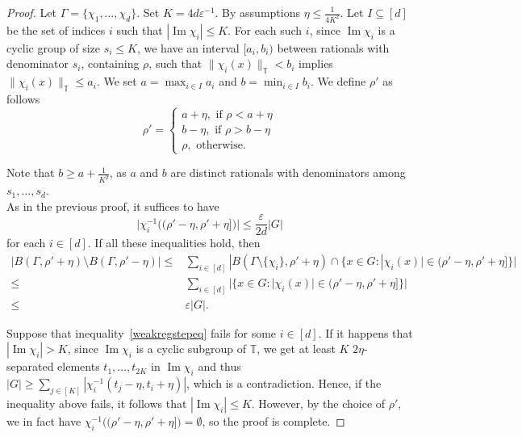 \documentclass[a4paper,11pt]{article}
\numberwithin{theorem}{section}
\theoremstyle{definition}
\newcommand{\on}[1]{
	\operatorname{#1}
}
\begin{document}
\begin{proof}
    Let $\Gamma = \{\chi_1, \dots, \chi_d\}$. Set $K = 4d \varepsilon^{-1}$. By assumptions $\eta \leq \frac{1}{4K^2}$. Let $I \subseteq [d]$ be the set of indices $i$ such that $|\on{Im} \chi_i| \leq K$. For each such $i$, since $\on{Im} \chi_i$ is a cyclic group of size $s_i \leq K$, we have an interval $[a_i, b_i)$ between rationals with denominator $s_i$, containing $\rho$, such that $\|\chi_i(x)\|_{\mathbb{T}} < b_i$ implies $\|\chi_i(x)\|_{\mathbb{T}} \leq a_i$. We set $a = \max_{i \in I} a_i$ and $b = \min_{i \in I} b_i$. We define $\rho'$ as follows
    \[\rho' = \begin{cases} 
        a + \eta,\text{ if } \rho < a + \eta\\
        b - \eta,\text{ if } \rho > b - \eta\\
        \rho,\text{ otherwise}.
    \end{cases}\]

    Note that $b \geq a + \frac{1}{K^2}$, as $a$ and $b$ are distinct rationals with denominators among $s_1, \dots, s_d$.\\
    
    As in the previous proof, it suffices to have
    \begin{equation}
        \Big|\chi_i^{-1}\Big((\rho' - \eta, \rho' + \eta]\Big)\Big| \leq \frac{\varepsilon}{2d}|G|\label{weakregstepeq}
    \end{equation} for each $i \in [d]$. If all these inequalities hold, then
    \begin{align*}|B(\Gamma, \rho' + \eta) \setminus B(\Gamma, \rho' - \eta)| \leq &\sum_{i \in [d]} |B(\Gamma \setminus \{\chi_i\}, \rho' + \eta) \cap \{x \in G : |\chi_i(x)| \in (\rho' - \eta, \rho' + \eta]\}|\\
    \leq & \sum_{i \in [d]} |\{x \in G : |\chi_i(x)| \in (\rho' - \eta, \rho' + \eta]\}|
\\
\leq & \varepsilon |G|.\end{align*}

    Suppose that inequality~\eqref{weakregstepeq} fails for some $i \in [d]$. If it happens that $|\on{Im} \chi_i| > K$, since $\on{Im} \chi_i$ is a cyclic subgroup of $\mathbb{T}$, we get at least $K$ $2\eta$-separated elements $t_1, \dots, t_{2K}$ in $\on{Im} \chi_i$ and thus $|G| \geq\sum_{j \in [K]} |\chi_i^{-1}(t_j - \eta, t_i + \eta)|$, which is a contradiction. Hence, if the inequality above fails, it follows that $|\on{Im} \chi_i| \leq K$. However, by the choice of $\rho'$, we in fact have $\chi_i^{-1}\Big((\rho' - \eta, \rho' + \eta]\Big) = \emptyset$, so the proof is complete.
\end{proof}
\end{document}
